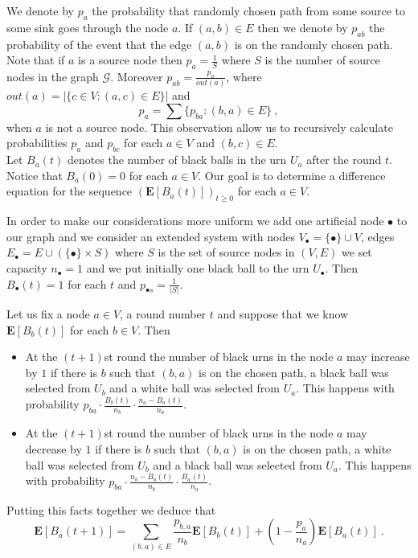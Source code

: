 \documentclass[submission]{dmtcs}
\newcommand{\E}[1]{\mathbf{E}\left[#1\right]}
\begin{document}
We denote by $p_a$ the probability that randomly chosen path 
from some source to some sink goes through the node $a$. 
If $(a,b) \in E$ then 
we denote by $p_{ab}$ the probability of the event that the edge $(a,b)$ 
is on the randomly chosen path.
Note that if $a$ is a source node then $p_a = \frac{1}{S}$ where $S$ is the 
number of source nodes in the graph $\mathcal{G}$.  
Moreover $p_{ab} = \frac{p_a}{out(a)}$, where 
$out(a) = |\{c\in V: (a,c)\in E\}|$ and
$$
	p_a = \sum \{p_{ba}: (b,a)\in E\} ~,
$$
when $a$ is not a source node. This observation allow us to recursively 
calculate probabilities $p_a$ and $p_{bc}$ for each $a\in V$ and 
$(b,c) \in E$.\\

Let $B_a(t)$ denotes the number of black balls in the urn $U_a$ 
after the round $t$. Notice that $B_a(0) = 0$ for each $a\in V$.
Our goal is to determine a difference equation for 
the sequence $(\E{B_a(t)})_{t\geq 0}$ for each $a\in V$.

In order to make our considerations more uniform we add one 
artificial node $\bullet$ to our graph and we consider an extended system
with nodes $V_{\bullet}= \{\bullet\} \cup V$, 
edges $E_{\bullet} = E\cup (\{\bullet\}\times S)$ where $S$ is the set of 
source nodes in $(V,E)$
we set capacity
$n_\bullet = 1$ and we put initially one black ball to
the urn $U_\bullet$. Then $B_\bullet(t) = 1$ for each 
$t$ and $p_{\bullet s} = \frac{1}{|S|}$.  
  




Let us fix a node $a \in V$, a round  number $t$ 
and suppose that we know $\E{B_b(t)}$  for each $b\in V$.
Then
\begin{itemize}
\item
At the $(t+1)$st round the number of black urns in the node $a$ may increase by $1$
if there is $b$ such that $(b,a)$ is on the chosen path, 
a black ball was selected from $U_b$ and a white ball was selected from $U_a$.
This happens with probability $p_{ba} \cdot \frac{B_b(t)}{n_b} \cdot \frac{n_a - B_a(t)}{n_a}$.
\item
At the $(t+1)$st round the number of black urns in the node $a$ may decrease by $1$
if there is $b$ such that $(b,a)$ is on the chosen path, 
a white ball was selected from $U_b$ and a black ball was selected from $U_a$.
This happens with probability $p_{ba} \cdot \frac{n_b - B_b(t)}{n_b} \cdot\frac{B_a(t)}{n_a}$.
\end{itemize}
Putting this facts together we deduce that
\begin{equation}
\label{eq:generalRecurrence}
\E{B_a(t+1)} = 
\sum_{(b,a)\in E} \frac{p_{b,a}}{n_b} \E{B_b(t)} +
\left(1-\frac{p_a}{n_a}\right) \E{B_a(t)}~.
\end{equation}
\end{document}
